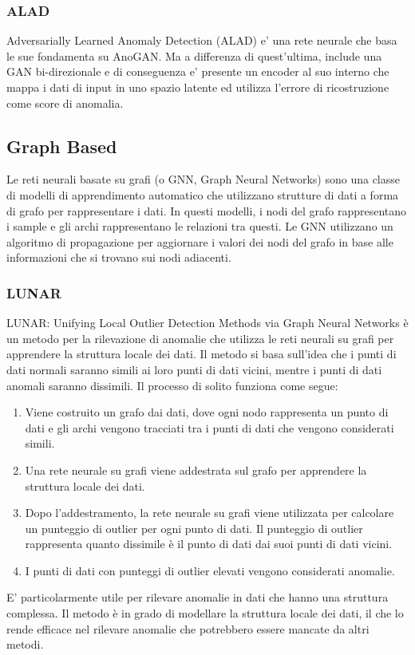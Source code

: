 \subsubsection{ALAD}
Adversarially Learned Anomaly Detection (ALAD)  e' una rete neurale che basa le sue fondamenta su AnoGAN. Ma a differenza di quest'ultima, include una GAN bi-direzionale e di conseguenza e' presente un encoder al suo interno che mappa i dati di input in uno spazio latente ed utilizza l'errore di ricostruzione come score di anomalia.

\subsection{Graph Based}
Le reti neurali basate su grafi (o GNN, Graph Neural Networks) sono una classe di modelli di apprendimento automatico che utilizzano strutture di dati a forma di grafo per rappresentare i dati. In questi modelli, i nodi del grafo rappresentano i sample e gli archi rappresentano le relazioni tra questi. Le GNN utilizzano un algoritmo di propagazione per aggiornare i valori dei nodi del grafo in base alle informazioni che si trovano sui nodi adiacenti.

\subsubsection{LUNAR}
LUNAR: Unifying Local Outlier Detection Methods via Graph Neural Networks è un metodo per la rilevazione di anomalie che utilizza le reti neurali su grafi per apprendere la struttura locale dei dati. Il metodo si basa sull'idea che i punti di dati normali saranno simili ai loro punti di dati vicini, mentre i punti di dati anomali saranno dissimili.
Il processo di solito funziona come segue:
\begin{enumerate}
\item Viene costruito un grafo dai dati, dove ogni nodo rappresenta un punto di dati e gli archi vengono tracciati tra i punti di dati che vengono considerati simili.
\item Una rete neurale su grafi viene addestrata sul grafo per apprendere la struttura locale dei dati.
\item Dopo l'addestramento, la rete neurale su grafi viene utilizzata per calcolare un punteggio di outlier per ogni punto di dati. Il punteggio di outlier rappresenta quanto dissimile è il punto di dati dai suoi punti di dati vicini.
\item I punti di dati con punteggi di outlier elevati vengono considerati anomalie.

\end{enumerate}
E' particolarmente utile per rilevare anomalie in dati che hanno una struttura complessa. Il metodo è in grado di modellare la struttura locale dei dati, il che lo rende efficace nel rilevare anomalie che potrebbero essere mancate da altri metodi.




